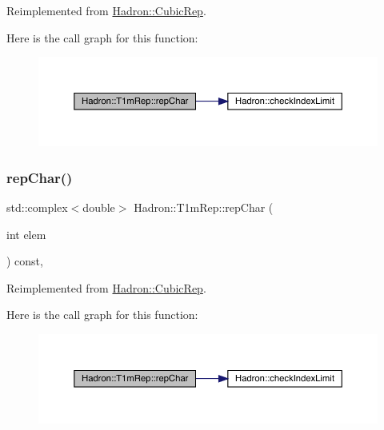 Reimplemented from \mbox{\hyperlink{structHadron_1_1CubicRep_af45227106e8e715e84b0af69cd3b36f8}{Hadron\+::\+Cubic\+Rep}}.

Here is the call graph for this function\+:
\nopagebreak
\begin{figure}[H]
\begin{center}
\leavevmode
\includegraphics[width=350pt]{de/dd9/structHadron_1_1T1mRep_a3605cd47c3e2c6eb4d6982fafa0a1b89_cgraph}
\end{center}
\end{figure}
\mbox{\label{structHadron_1_1T1mRep_a3605cd47c3e2c6eb4d6982fafa0a1b89}} 
\subsubsection{\texorpdfstring{repChar()}{repChar()}\hspace{0.1cm}{\footnotesize\ttfamily [3/3]}}
{\footnotesize\ttfamily std\+::complex$<$double$>$ Hadron\+::\+T1m\+Rep\+::rep\+Char (\begin{DoxyParamCaption}\item[{int}]{elem }\end{DoxyParamCaption}) const\hspace{0.3cm}{\ttfamily [inline]}, {\ttfamily [virtual]}}



Reimplemented from \mbox{\hyperlink{structHadron_1_1CubicRep_af45227106e8e715e84b0af69cd3b36f8}{Hadron\+::\+Cubic\+Rep}}.

Here is the call graph for this function\+:
\nopagebreak
\begin{figure}[H]
\begin{center}
\leavevmode
\includegraphics[width=350pt]{de/dd9/structHadron_1_1T1mRep_a3605cd47c3e2c6eb4d6982fafa0a1b89_cgraph}
\end{center}
\end{figure}
\mbox{\label{structHadron_1_1T1mRep_a77a8ee94e1ed9406845c8d1106f73599}} 
